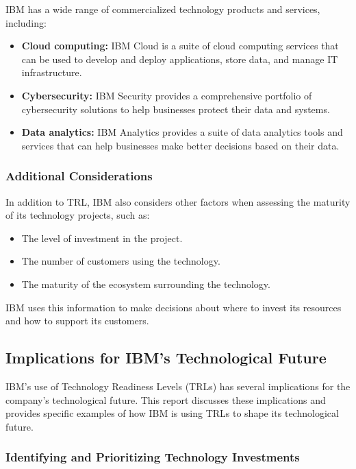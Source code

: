 IBM has a wide range of commercialized technology products and services, including:

\begin{itemize}
    \item \textbf{Cloud computing:} IBM Cloud is a suite of cloud computing services that can be used to develop and deploy applications, store data, and manage IT infrastructure.
    \item \textbf{Cybersecurity:} IBM Security provides a comprehensive portfolio of cybersecurity solutions to help businesses protect their data and systems.
    \item \textbf{Data analytics:} IBM Analytics provides a suite of data analytics tools and services that can help businesses make better decisions based on their data.
\end{itemize}


\subsubsection{Additional Considerations}

In addition to TRL, IBM also considers other factors when assessing the maturity of its technology projects, such as:

\begin{itemize}
    \item The level of investment in the project.
    \item The number of customers using the technology.
    \item The maturity of the ecosystem surrounding the technology.
\end{itemize}

IBM uses this information to make decisions about where to invest its resources and how to support its customers.

\subsection{Implications for IBM's Technological Future}
IBM's use of Technology Readiness Levels (TRLs) has several implications for the company's technological future. This report discusses these implications and provides specific examples of how IBM is using TRLs to shape its technological future.



\subsubsection{Identifying and Prioritizing Technology Investments}

